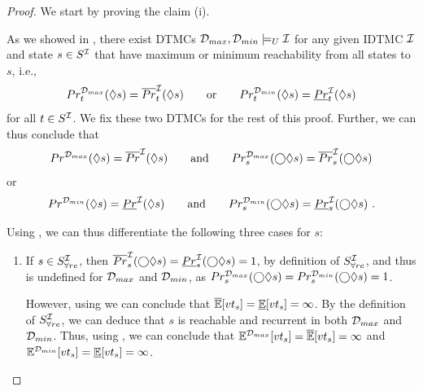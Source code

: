 \begin{proof}\label{pr:u/lEVTs_via_reach_and_semantics_coincide}
    We start by proving the claim (i).

    As we showed in , there exist DTMCs $\mathcal{D}_{max}, \mathcal{D}_{min} \models_U \mathcal{I}$ for any given IDTMC $\mathcal{I}$ and state $s\in S^{\mathcal{I}}$ that have maximum or minimum reachability from all states to $s$, i.e., 
    \[Pr^{\mathcal{D}_{max}}_t(\lozenge s) = \overline{Pr}^{\mathcal{I}}_t(\lozenge s) \qquad \text{or} \qquad Pr^{\mathcal{D}_{min}}_t(\lozenge s) = \underline{Pr}^{\mathcal{I}}_t(\lozenge s)\] 
    for all $t\in S^{\mathcal{I}}$. We fix these two DTMCs for the rest of this proof. Further, we can thus conclude that 
    \begin{equation}\label{eq:Pr_of_max_equals_Prupper}
        Pr^{\mathcal{D}_{max}}(\lozenge s) = \overline{Pr}^{\mathcal{I}}(\lozenge s) \qquad \text{and} \qquad Pr^{\mathcal{D}_{max}}_s(\bigcirc\lozenge s) = \overline{Pr}^{\mathcal{I}}_s(\bigcirc \lozenge s)
    \end{equation}
    or 
    \begin{equation}\label{eq:Pr_of_min_equals_Prlower}
        Pr^{\mathcal{D}_{min}}(\lozenge s) = \underline{Pr}^{\mathcal{I}}(\lozenge s) \qquad \text{and} \qquad Pr^{\mathcal{D}_{min}}_s(\bigcirc\lozenge s) = \underline{Pr}^{\mathcal{I}}_s(\bigcirc \lozenge s)\ .
    \end{equation}

    Using , we can thus differentiate the following three cases for $s$:
    \begin{enumerate}
        \item If $s \in S^{\mathcal{I}}_{\forall re}$, then $\overline{Pr}^{\mathcal{I}}_s(\bigcirc\lozenge s) = \underline{Pr}^{\mathcal{I}}_s(\bigcirc\lozenge s) = 1$, by definition of $S^{\mathcal{I}}_{\forall re}$, and thus  is undefined for $\mathcal{D}_{max}$ and $\mathcal{D}_{min}$, as $Pr^{\mathcal{D}_{max}}_s(\bigcirc\lozenge s) = Pr^{\mathcal{D}_{min}}_s(\bigcirc\lozenge s) = 1$. 

        However, using  we can conclude that $\mathbb{\overline{E}}[vt_s] = \mathbb{\underline{E}}[vt_s] = \infty$. By the definition of $S^{\mathcal{I}}_{\forall re}$, we can deduce that $s$ is reachable and recurrent in both $\mathcal{D}_{max}$ and $\mathcal{D}_{min}$. Thus, using , we can conclude that $\mathbb{E}^{\mathcal{D}_{max}}[vt_s] = \mathbb{\overline{E}}[vt_s] = \infty$ and $\mathbb{E}^{\mathcal{D}_{min}}[vt_s] = \mathbb{\underline{E}}[vt_s] = \infty$.


\end{enumerate}
\end{proof}
